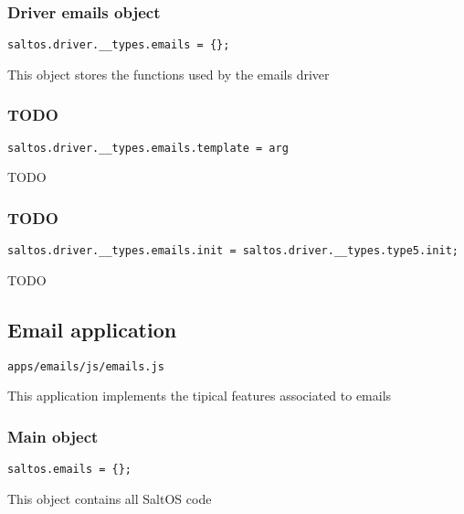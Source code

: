 \documentclass[a4paper]{article}
\begin{document}
\subsubsection{Driver emails object}

\begin{lstlisting}
saltos.driver.__types.emails = {};
\end{lstlisting}

This object stores the functions used by the emails driver

\hypertarget{toc47}{}
\subsubsection{TODO}

\begin{lstlisting}
saltos.driver.__types.emails.template = arg
\end{lstlisting}

TODO

\hypertarget{toc48}{}
\subsubsection{TODO}

\begin{lstlisting}
saltos.driver.__types.emails.init = saltos.driver.__types.type5.init;
\end{lstlisting}

TODO

\hypertarget{toc49}{}
\subsection{Email application}

\begin{lstlisting}
apps/emails/js/emails.js
\end{lstlisting}

This application implements the tipical features associated to emails

\hypertarget{toc50}{}
\subsubsection{Main object}

\begin{lstlisting}
saltos.emails = {};
\end{lstlisting}

This object contains all SaltOS code

\hypertarget{toc51}{}
\end{document}
